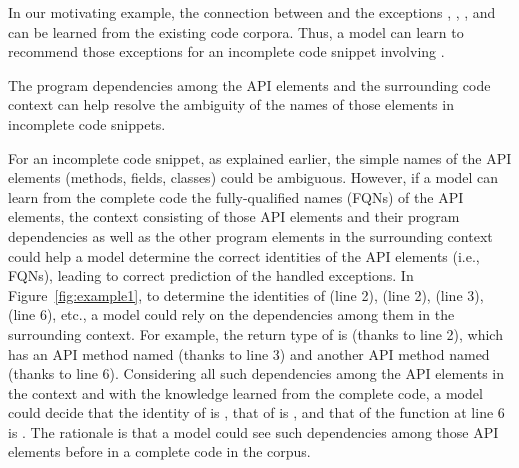 In our motivating example, the connection between
 and the exceptions
, ,
, and
 can be learned from the existing
code corpora. Thus, a model can learn to recommend those exceptions
for an incomplete code snippet involving .

\begin{Observation} 
\label{ob4}
The program dependencies among the API elements and the surrounding
code context can help resolve the ambiguity of the names of those
elements in incomplete code snippets.
\end{Observation}

For an incomplete code snippet, as explained earlier, the simple names
of the API elements (methods, fields, classes) could be ambiguous.
However, if a model can learn from the complete code the
fully-qualified names (FQNs) of the API elements, the context
consisting of those API elements and their program dependencies as
well as the other program elements in the surrounding context could
help a model determine the correct identities of the API elements
(i.e., FQNs), leading to correct prediction of the handled exceptions.
%
In Figure~\ref{fig:example1}, to determine the identities of
 (line 2),  (line 2),
 (line 3),  (line 6), etc., a model
could rely on the dependencies among them in the surrounding context.
For example, the return type of  is
 (thanks to line 2), which has an API method named
 (thanks to line 3) and another API method named
 (thanks to line 6). Considering all such dependencies among
the API elements in the context and with the knowledge learned from
the complete code, a model could decide that the identity of
 is , that of
 is
, and that of the
 function at line 6 is
. The rationale is that a
model could see such dependencies among those API elements before in
a complete code in the corpus.



